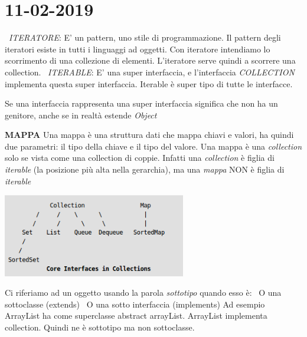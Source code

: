 

\newpage
\section{11-02-2019}
\textbullet\  \textit{ITERATORE}: E' un pattern, uno stile di programmazione. Il pattern degli iteratori esiste in tutti i linguaggi ad oggetti. Con iteratore intendiamo lo scorrimento di una collezione di elementi. L'iteratore serve quindi a scorrere una collection.\newline
\textbullet\ \textit{ITERABLE}: E' una super interfaccia, e l'interfaccia \textit{COLLECTION} implementa questa super interfaccia. Iterable è super tipo di tutte le interfacce.

\noindent Se una interfaccia rappresenta una super interfaccia significa che non ha un genitore, anche se in realtà estende \textit{Object}


\noindent \textbf{MAPPA}\newline
Una mappa è una struttura dati che mappa chiavi e valori, ha quindi due parametri: il tipo della chiave e il tipo del valore. Una mappa è una \textit{collection} solo se vista come una collection di coppie. Infatti una \textit{collection} è figlia di \textit{iterable} (la posizione più alta nella gerarchia), ma una \textit{mappa} NON è figlia di \textit{iterable}
\begin{center}
\includegraphics[width=%
0.6\textwidth]{MapInterface}
\end{center} 
Ci riferiamo ad un oggetto usando la parola \textit{sottotipo} quando esso è:\newline
\textbullet\ O una sottoclasse (extends) \newline
\textbullet\ O una sotto interfaccia (implements) \newline
Ad esempio ArrayList ha come superclasse abstract arrayList. ArrayList implementa collection. Quindi ne è sottotipo ma non sottoclasse.

